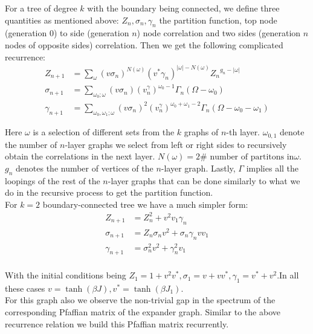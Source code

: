 \documentclass{article}
\begin{document}
	
	For a tree of degree $k$ with the boundary being connected, we define three quantities as mentioned above: $Z_n, \sigma_n, \gamma_n$ the partition function, top node (generation $0$) to side (generation $n$) node correlation and two sides (generation $n$ nodes of opposite sides) correlation. Then we get the following complicated recurrence: \\
	
	\begin{align}
		Z_{n+1} &= \sum_{\omega} (v\sigma_n)^{N(\omega)}(v^* \gamma_n)^{|\omega|-N(\omega)} {Z_n}^{g_n-|\omega|} \tag{1.1} \\
		\sigma_{n+1} &= \sum_{\omega_0;\omega}(v\sigma_n)(v^\gamma_n)^{\omega_0-1}\Gamma_n(\Omega-\omega_0) \tag{1.2} \\
		\gamma_{n+1} &= \sum_{\omega_0,\omega_1;\omega}(v\sigma_n)^2(v^\gamma_n)^{\omega_0+\omega_1-2}\Gamma_n(\Omega-\omega_0-\omega_1) \tag{1.3}
	\end{align}
	
	Here $\omega$ is a selection of different sets from the $k$ graphs of $n$-th layer. $\omega_{0,1}$ denote the number of $n$-layer graphs we select from left or right sides to recursively obtain the correlations in the next layer. $N(\omega)=2\text{# number of partitons in}\omega$. $g_n$ denotes the number of vertices of the $n$-layer graph. Lastly, $\Gamma$ implies all the loopings of the rest of the $n$-layer graphs that can be done similarly to what we do in the recursive process to get the partition function. \\ 
	
	For $k=2$ boundary-connected tree we have a much simpler form:
	\begin{align}
		Z_{n+1} &= Z_n^2+v^2v_1\gamma_n \tag{2.1} \\
		\sigma_{n+1} &= Z_n\sigma_n v^2+\sigma_n \gamma_n vv_1 \tag{2.2} \\
		\gamma_{n+1} &= \sigma_n^2v^2+\gamma_n^2 v_1 \tag{2.3} 
	\end{align} \\
	With the initial conditions being $Z_1=1+v^2v^*, \sigma_1=v+vv^* ,\gamma_1=v^*+v^2$.In all these cases $v=\tanh(\beta J), v^*=\tanh(\beta J_1)$.\\
	
	For this graph also we observe the non-trivial gap in the spectrum of the corresponding Pfaffian matrix of the expander graph. Similar to the above recurrence relation we build this Pfaffian matrix recurrently. \\
	
\end{document}
